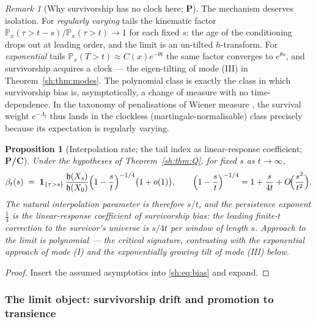 \documentclass[11pt]{article}
\numberwithin{equation}{section}
\theoremstyle{plain}
\newtheorem{proposition}[theorem]{Proposition}
\theoremstyle{definition}
\theoremstyle{remark}
\newtheorem{remark}[theorem]{Remark}
\newcommand{\PP}{\mathbb{P}}
\newcommand{\one}{\mathbf{1}}
\newcommand{\hm}{\mathfrak{h}}
\begin{document}
\begin{remark}[Why survivorship has no clock here; \textbf{P}]
\label{sh:rem:noclock}
The mechanism deserves isolation. For \emph{regularly varying} tails the
kinematic factor $\PP_x(\tau>t-s)/\PP_x(\tau>t)\to1$ for each fixed $s$:
the age of the conditioning drops out at leading order, and the limit is
an un-tilted $h$-transform. For \emph{exponential} tails
$\PP_x(T>t)\approx C(x)e^{-\theta t}$ the same factor converges to
$e^{\theta s}$, and survivorship acquires a clock --- the eigen-tilting
of mode (III) in Theorem~\ref{sh:thm:modes}. The polynomial class is
exactly the class in which survivorship bias is, asymptotically, a
change of measure with no time-dependence. In the taxonomy of
penalisations of Wiener measure \cite{RVY06}, the survival weight
$e^{-\Lambda_t}$ thus lands in the clockless (martingale-normalisable)
class precisely because its expectation is regularly varying.
\end{remark}

\begin{proposition}[Interpolation rate; the tail index as linear-response
coefficient; \textbf{P/C}]\label{sh:prop:rate}
Under the hypotheses of Theorem~\ref{sh:thm:Q}, for fixed $s$ as
$t\to\infty$,
\begin{equation}\label{sh:eq:rate-interp}
\beta_t(s)\;=\;\one_{\{\tau>s\}}\,\frac{\hm(X_s)}{\hm(X_0)}
\Bigl(1-\frac st\Bigr)^{-1/4}\bigl(1+o(1)\bigr),
\qquad
\Bigl(1-\frac st\Bigr)^{-1/4}=1+\frac{s}{4t}+O\!\Bigl(\frac{s^2}{t^2}\Bigr).
\end{equation}
The natural interpolation parameter is therefore $s/t$, and the
persistence exponent $\tfrac14$ is the linear-response coefficient of
survivorship bias: the leading finite-$t$ correction to the survivor's
universe is $s/4t$ per window of length $s$. Approach to the limit is
polynomial --- the critical signature, contrasting with the exponential
approach of mode (I) and the exponentially growing tilt of mode (III)
below.
\end{proposition}

\begin{proof}
Insert the assumed asymptotics into \eqref{sh:eq:bias} and expand.
\end{proof}

\subsubsection{The limit object: survivorship drift and promotion to
transience}\label{sh:subsub:promotion}
\end{document}
